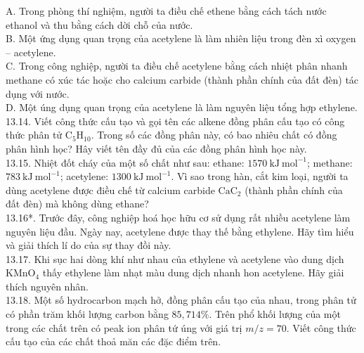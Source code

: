 \documentclass[10pt]{article}
\begin{document}
A. Trong phòng thí nghiệm, người ta điều chế ethene bằng cách tách nước ethanol và thu bằng cách dời chỗ của nước.\\
B. Một ứng dụng quan trọng của acetylene là làm nhiên liệu trong đèn xì oxygen -- acetylene.\\
C. Trong công nghiệp, người ta điều chế acetylene bằng cách nhiệt phân nhanh methane có xúc tác hoặc cho calcium carbide (thành phần chính của đất đèn) tác dụng với nước.\\
D. Một úng dụng quan trọng của acetylene là làm nguyên liệu tổng hợp ethylene.\\
13.14. Viết công thức cấu tạo và gọi tên các alkene đồng phân cấu tạo có công thức phân tử $\mathrm{C}_{5} \mathrm{H}_{10}$. Trong số các đồng phân này, có bao nhiêu chất có đồng phân hình học? Hây viết tên đầy đủ của các đồng phân hình học này.\\
13.15. Nhiệt đốt cháy của một số chất như sau: ethane: $1570 \mathrm{~kJ} \mathrm{~mol}^{-1}$; methane: $783 \mathrm{~kJ} \mathrm{~mol}^{-1}$; acetylene: $1300 \mathrm{~kJ} \mathrm{~mol}^{-1}$. Vì sao trong hàn, cắt kim loại, người ta dùng acetylene được điều chế từ calcium carbide $\mathrm{CaC}_{2}$ (thành phần chính của đất đèn) mà không dùng ethane?\\
13.16*. Trước đây, công nghiệp hoá học hữu cơ sử dụng rất nhiều acetylene làm nguyên liệu đầu. Ngày nay, acetylene được thay thế bằng ethylene. Hãy tìm hiểu và giải thích lí do của sự thay đồi này.\\
13.17. Khi sục hai dòng khí như nhau của ethylene và acetylene vào dung dịch $\mathrm{KMnO}_{4}$ thấy ethylene làm nhạt màu dung dịch nhanh hon acetylene. Hãy giải thích nguyên nhân.\\
13.18. Một số hydrocarbon mạch hở, đồng phân cấu tạo của nhau, trong phân tử có phần trăm khối lượng carbon bằng $85,714 \%$. Trên phổ khối lượng của một trong các chất trên có peak ion phân tứ úng với giá trị $m / z=70$. Viết công thức cấu tạo của các chất thoả măn các đặc điểm trên.
\end{document}
